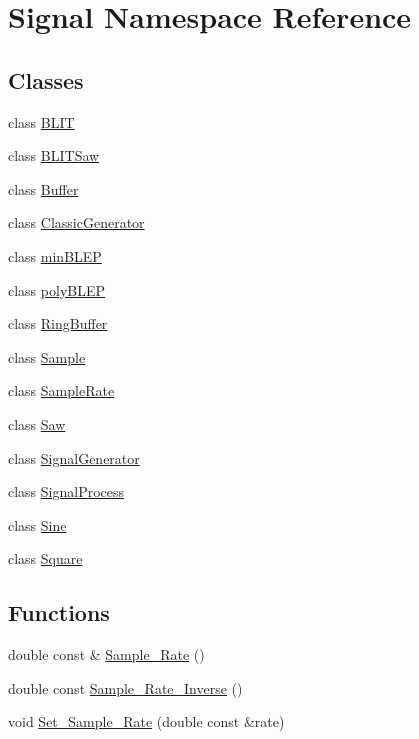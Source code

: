 \hypertarget{namespace_signal}{\section{Signal Namespace Reference}
\label{namespace_signal}
}
\subsection*{Classes}
\begin{DoxyCompactItemize}
\item 
class \hyperlink{class_signal_1_1_b_l_i_t}{B\+L\+I\+T}
\item 
class \hyperlink{class_signal_1_1_b_l_i_t_saw}{B\+L\+I\+T\+Saw}
\item 
class \hyperlink{class_signal_1_1_buffer}{Buffer}
\item 
class \hyperlink{class_signal_1_1_classic_generator}{Classic\+Generator}
\item 
class \hyperlink{class_signal_1_1min_b_l_e_p}{min\+B\+L\+E\+P}
\item 
class \hyperlink{class_signal_1_1poly_b_l_e_p}{poly\+B\+L\+E\+P}
\item 
class \hyperlink{class_signal_1_1_ring_buffer}{Ring\+Buffer}
\item 
class \hyperlink{class_signal_1_1_sample}{Sample}
\item 
class \hyperlink{class_signal_1_1_sample_rate}{Sample\+Rate}
\item 
class \hyperlink{class_signal_1_1_saw}{Saw}
\item 
class \hyperlink{class_signal_1_1_signal_generator}{Signal\+Generator}
\item 
class \hyperlink{class_signal_1_1_signal_process}{Signal\+Process}
\item 
class \hyperlink{class_signal_1_1_sine}{Sine}
\item 
class \hyperlink{class_signal_1_1_square}{Square}
\end{DoxyCompactItemize}
\subsection*{Functions}
\begin{DoxyCompactItemize}
\item 
double const \& \hyperlink{namespace_signal_ae7b1f222afc010e0f33f306f978fcde9}{Sample\+\_\+\+Rate} ()
\item 
double const \hyperlink{namespace_signal_ae7e8bbfcac6571aaaf18d7f96f3fefc3}{Sample\+\_\+\+Rate\+\_\+\+Inverse} ()
\item 
void \hyperlink{namespace_signal_a2f163a7bbf1b0fc76ceba8b0916a7890}{Set\+\_\+\+Sample\+\_\+\+Rate} (double const \&rate)
\end{DoxyCompactItemize}


